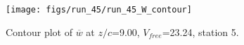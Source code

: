 \begin{figure}[H]
\centering
\texttt{[image: figs/run\_45/run\_45\_W\_contour]}
\caption{Contour plot of $\overline{w}$ at $z/c$=9.00, $V_{free}$=23.24, station 5.}
\label{fig:run_45_W_contour}
\end{figure}


